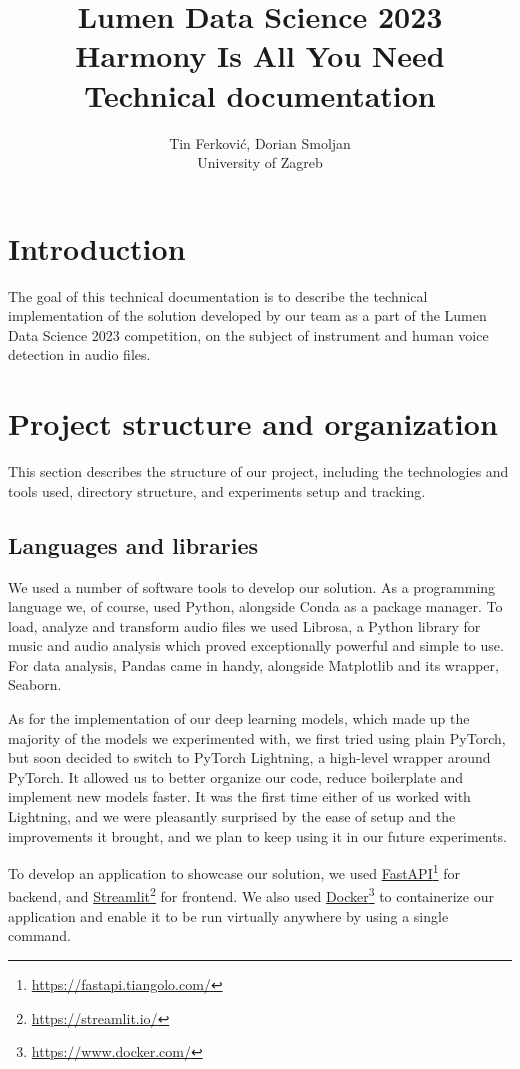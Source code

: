 \documentclass{ol-softwaremanual}
\title{\Huge \mdseries \textbf{Lumen Data Science 2023} \\ Harmony Is All You Need \\ \Large Technical documentation}
\author{Tin Ferković, Dorian Smoljan \\ \normalsize University of Zagreb}
\newcommand{\doclink}[2]{\href{#1}{#2}\footnote{\url{#1}}}
\begin{document}
\maketitle

\tableofcontents
\listoflistings
\newpage

\section{Introduction}

The goal of this technical documentation is to describe the technical implementation of the solution developed by our team as a part of the Lumen Data Science 2023 competition, on the subject of instrument and human voice detection in audio files.

\clearpage

\section{Project structure and organization}

This section describes the structure of our project, including the technologies and tools used, directory structure, and experiments setup and tracking.


\subsection{Languages and libraries}

We used a number of software tools to develop our solution. As a programming language we, of course, used Python, alongside Conda as a package manager. To load, analyze and transform audio files we used Librosa, a Python library for music and audio analysis which proved exceptionally powerful and simple to use. For data analysis, Pandas came in handy, alongside Matplotlib and its wrapper, Seaborn.

As for the implementation of our deep learning models, which made up the majority of the models we experimented with, we first tried using plain PyTorch, but soon decided to switch to PyTorch Lightning, a high-level wrapper around PyTorch. It allowed us to better organize our code, reduce boilerplate and implement new models faster. It was the first time either of us worked with Lightning, and we were pleasantly surprised by the ease of setup and the improvements it brought, and we plan to keep using it in our future experiments.

To develop an application to showcase our solution, we used \doclink{https://fastapi.tiangolo.com/}{FastAPI}  for backend, and \doclink{https://streamlit.io/}{Streamlit} for frontend. We also used \doclink{https://www.docker.com/}{Docker} to containerize our application and enable it to be run virtually anywhere by using a single command. 
\end{document}
